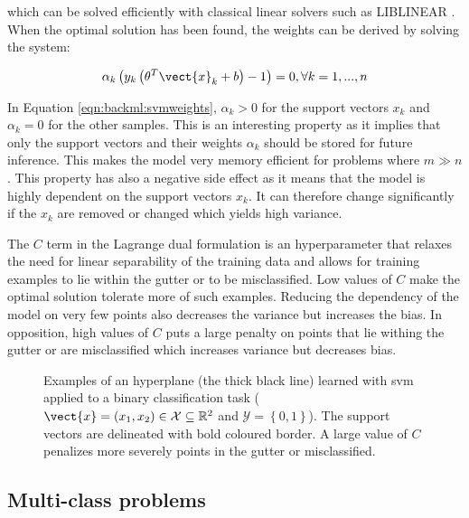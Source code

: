 which can be solved efficiently with classical linear solvers such as LIBLINEAR
\parencite{fan2008liblinear}. When the optimal solution has been found, the weights
can be derived by solving the system:

\begin{equation}
\label{eqn:backml:svmweights}
\alpha_k\left(y_k \left(\theta^T \vect{x}_k + b\right) - 1\right) = 0, \forall k = 1, ..., n
\end{equation}

In Equation \ref{eqn:backml:svmweights}, $\alpha_k > 0$ for the support vectors
$x_k$ and $\alpha_k = 0$ for the other samples. This is an interesting property
as it implies that only the support vectors and their weights $\alpha_k$ should
be stored for future inference. This makes the model very memory efficient for
problems where $m \gg n$. This property has also a negative side effect as it
means that the model is highly dependent on the support vectors $x_k$. It can
therefore change significantly if the $x_k$ are removed or changed which yields
high variance. 

The $C$ term in the Lagrange dual formulation is an hyperparameter
that relaxes the need for linear separability of the training data and allows for
training examples to lie within the gutter or to be misclassified. Low values of
$C$ make the optimal solution tolerate more of such examples. Reducing the dependency
of the model on very few points also decreases the variance but increases the
bias. In opposition, high values of $C$ puts a large penalty on points that lie
withing the gutter or are misclassified which increases variance but decreases
bias.

\begin{figure}
  \centering
  \caption{Examples of an hyperplane (the thick black line) learned with \acrshort{svm} applied to a binary classification task ($\vect{x} = (x_1, x_2) \in \mathcal{X} \subseteq \mathbb{R}^2$ and $\mathcal{Y} = \left\{0, 1\right\}$). The support vectors are delineated with bold coloured border. A large value of $C$ penalizes more severely points in the gutter or misclassified.}
  \label{fig:backml:svm}
\end{figure}


\subsection{Multi-class problems}

